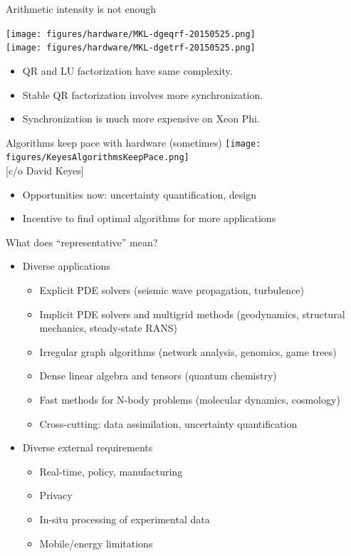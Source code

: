 \documentclass{beamer}
\begin{document}
\begin{frame}{Arithmetic intensity is not enough}
  \begin{center}
    \texttt{[image: figures/hardware/MKL-dgeqrf-20150525.png]} \\
    \texttt{[image: figures/hardware/MKL-dgetrf-20150525.png]}
  \end{center}
  \begin{itemize}
  \item QR and LU factorization have same complexity.
  \item Stable QR factorization involves more synchronization.
  \item Synchronization is much more expensive on Xeon Phi.
  \end{itemize}
\end{frame}

\begin{frame}{Algorithms keep pace with hardware (sometimes)}
  \texttt{[image: figures/KeyesAlgorithmsKeepPace.png]} \\
  {\scriptsize [c/o David Keyes]}
  \begin{itemize}
  \item Opportunities now: uncertainty quantification, design
  \item Incentive to find optimal algorithms for more applications
  \end{itemize}
\end{frame}

\begin{frame}{What does ``representative'' mean?}
  \begin{itemize}
  \item Diverse applications
    \begin{itemize}
    \item Explicit PDE solvers (seismic wave propagation, turbulence)
    \item Implicit PDE solvers and multigrid methods (geodynamics, structural mechanics, steady-state RANS)
    \item Irregular graph algorithms (network analysis, genomics, game trees) 
    \item Dense linear algebra and tensors (quantum chemistry) 
    \item Fast methods for N-body problems (molecular dynamics, cosmology) 
    \item Cross-cutting: data assimilation, uncertainty quantification
    \end{itemize}
  \item Diverse external requirements
    \begin{itemize}
    \item Real-time, policy, manufacturing
    \item Privacy
    \item In-situ processing of experimental data
    \item Mobile/energy limitations
    \end{itemize}
  \end{itemize}
\end{frame}
\end{document}

